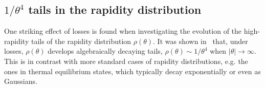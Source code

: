 \documentclass[onecolumn,amsfonts,showpacs,superscriptaddress]{revtex4-1}
\begin{document}




\subsection{$1/\theta^4$ tails in the  rapidity distribution}
One striking effect of losses is found when investigating the evolution of the high-rapidity tails of the rapidity distribution $\rho(\theta)$. 
It was shown in~\citep{bouchoule_breakdown_2020} that, under losses, $\rho(\theta)$ develops algebraically decaying tails,  $\rho(\theta) \sim 1/\theta^4$ when $|\theta|\rightarrow \infty$. This is in contrast with more standard cases of rapidity distributions, e.g. the ones in thermal equilibrium states, which typically decay exponentially or even as Gaussians.  %
\end{document}
